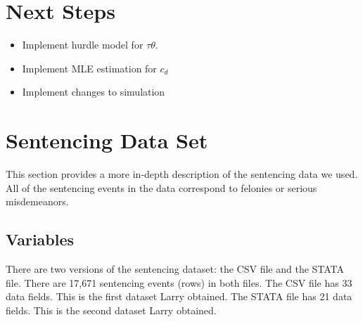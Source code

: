 \documentclass[11pt, oneside]{article}   	%
\theoremstyle{ModifiedStyle}
\begin{document}
\section{Next Steps}
  \begin{itemize}
    \item Implement hurdle model for $\tau \theta$.
    \item Implement MLE estimation for $c_d$
    \item Implement changes to simulation
  \end{itemize}




\appendix
\section{Sentencing Data Set}
  \label{Appendix:Sentencing_Data}
  This section provides a more in-depth description of the sentencing data we used. All of the sentencing events in the data correspond to felonies or serious misdemeanors.


  \subsection{Variables}
  	There are two versions of the sentencing dataset: the CSV file and the STATA file. There are 17,671 sentencing events (rows) in both files. The CSV file has 33 data fields. This is the first dataset Larry obtained. The STATA file has 21 data fields. This is the second dataset Larry obtained.
\end{document}
